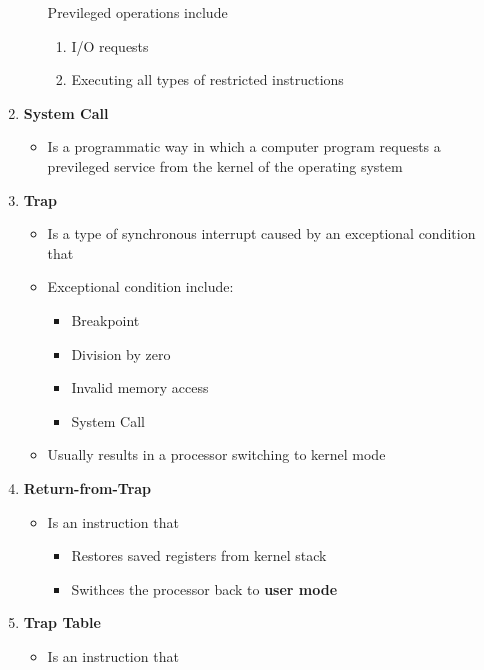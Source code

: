 \documentclass[12pt]{article}
\begin{document}
\begin{mdframed}
\begin{enumerate}[1.]
\begin{itemize}
        \bigskip

        Previleged operations include

        \begin{enumerate}[1.]
            \item I/O requests
            \item Executing all types of restricted instructions
        \end{enumerate}
    \end{itemize}
    \item \textbf{System Call}
    \begin{itemize}
        \item Is a programmatic way in which a computer program requests a previleged
        service from the kernel of the operating system
    \end{itemize}
    \item \textbf{Trap}
    \begin{itemize}
        \item Is a type of synchronous interrupt caused by an exceptional condition that
        \item Exceptional condition include:
        \begin{itemize}
            \item Breakpoint
            \item Division by zero
            \item Invalid memory access
            \item System Call
        \end{itemize}
        \item Usually results in a processor switching to kernel mode
    \end{itemize}
    \item \textbf{Return-from-Trap}
    \begin{itemize}
        \item Is an instruction that
        \begin{itemize}
            \item Restores saved registers from kernel stack
            \item Swithces the processor back to \textbf{user mode}
        \end{itemize}
    \end{itemize}
    \item \textbf{Trap Table}
    \begin{itemize}
        \item Is an instruction that

\end{itemize}
\end{enumerate}
\end{mdframed}
\end{document}
